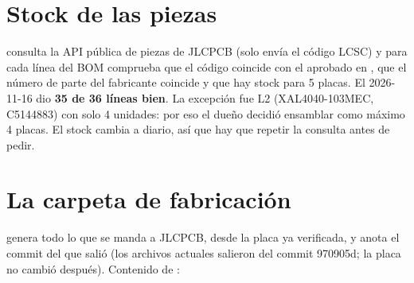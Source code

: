 \section{Stock de las piezas}\label{sec:c11-stock}

 consulta la API pública de piezas de JLCPCB (solo envía el código LCSC) y para cada
línea del BOM comprueba que el código coincide con el aprobado en , que el número de parte del
fabricante coincide y que hay stock para 5 placas. El 2026-11-16 dio \textbf{35 de 36 líneas bien}. La excepción fue
L2 (XAL4040-103MEC, C5144883) con solo 4 unidades: por eso el dueño decidió ensamblar como máximo 4 placas. El stock
cambia a diario, así que hay que repetir la consulta antes de pedir.

\section{La carpeta de fabricación}\label{sec:c11-fab}

 genera todo lo que se manda a JLCPCB, desde la placa ya verificada, y anota el commit
del que salió (los archivos actuales salieron del commit 970905d; la placa no cambió después). Contenido de
:

